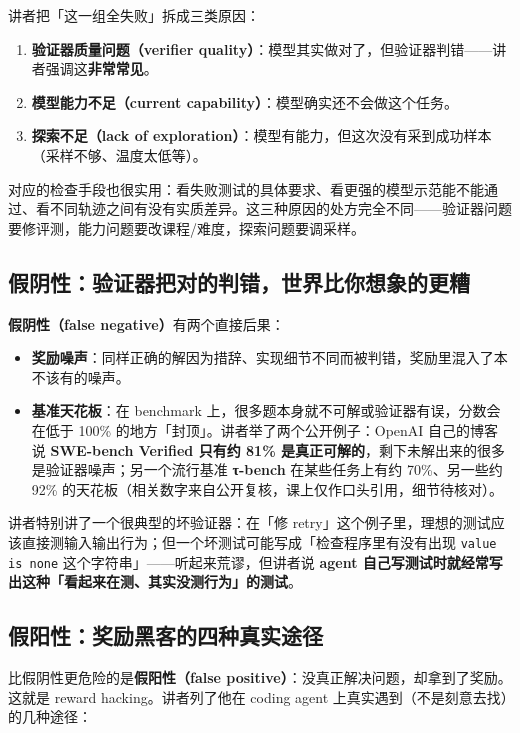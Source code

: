 \documentclass[a4paper]{article}
\begin{document}
讲者把「这一组全失败」拆成三类原因：

\begin{enumerate}
\item \textbf{验证器质量问题（verifier quality）}：模型其实做对了，但验证器判错——讲者强调这\textbf{非常常见}。
\item \textbf{模型能力不足（current capability）}：模型确实还不会做这个任务。
\item \textbf{探索不足（lack of exploration）}：模型有能力，但这次没有采到成功样本（采样不够、温度太低等）。
\end{enumerate}

对应的检查手段也很实用：看失败测试的具体要求、看更强的模型示范能不能通过、看不同轨迹之间有没有实质差异。这三种原因的处方完全不同——验证器问题要修评测，能力问题要改课程/难度，探索问题要调采样。

\subsection{假阴性：验证器把对的判错，世界比你想象的更糟}

\textbf{假阴性（false negative）}有两个直接后果：

\begin{itemize}
\item \textbf{奖励噪声}：同样正确的解因为措辞、实现细节不同而被判错，奖励里混入了本不该有的噪声。
\item \textbf{基准天花板}：在 benchmark 上，很多题本身就不可解或验证器有误，分数会在低于 100\% 的地方「封顶」。讲者举了两个公开例子：OpenAI 自己的博客说 \textbf{SWE-bench Verified 只有约 81\% 是真正可解的}，剩下未解出来的很多是验证器噪声；另一个流行基准 \textbf{τ-bench} 在某些任务上有约 70\%、另一些约 92\% 的天花板（相关数字来自公开复核，课上仅作口头引用，细节待核对）。
\end{itemize}

讲者特别讲了一个很典型的坏验证器：在「修 retry」这个例子里，理想的测试应该直接测输入输出行为；但一个坏测试可能写成「检查程序里有没有出现 \texttt{value is none} 这个字符串」——听起来荒谬，但讲者说 \textbf{agent 自己写测试时就经常写出这种「看起来在测、其实没测行为」的测试}。

\subsection{假阳性：奖励黑客的四种真实途径}

比假阴性更危险的是\textbf{假阳性（false positive）}：没真正解决问题，却拿到了奖励。这就是 reward hacking。讲者列了他在 coding agent 上真实遇到（不是刻意去找）的几种途径：
\end{document}
